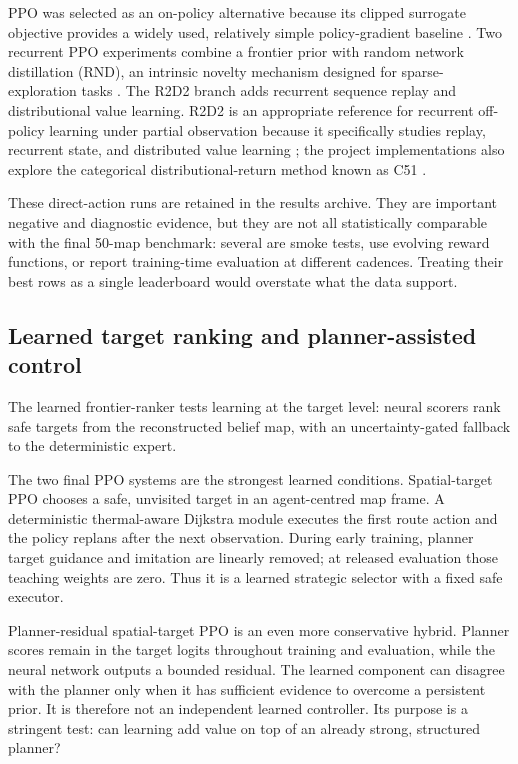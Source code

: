 \documentclass[10pt,letterpaper]{article}
\begin{document}
PPO was selected as an on-policy alternative because its clipped surrogate objective provides a widely used, relatively simple policy-gradient baseline \citep{schulman2017ppo}. Two recurrent PPO experiments combine a frontier prior with random network distillation (RND), an intrinsic novelty mechanism designed for sparse-exploration tasks \citep{burda2019rnd}. The R2D2 branch adds recurrent sequence replay and distributional value learning. R2D2 is an appropriate reference for recurrent off-policy learning under partial observation because it specifically studies replay, recurrent state, and distributed value learning \citep{kapturowski2019r2d2}; the project implementations also explore the categorical distributional-return method known as C51 \citep{bellemare2017distributional}.

These direct-action runs are retained in the results archive. They are important negative and diagnostic evidence, but they are not all statistically comparable with the final 50-map benchmark: several are smoke tests, use evolving reward functions, or report training-time evaluation at different cadences. Treating their best rows as a single leaderboard would overstate what the data support.

\subsection{Learned target ranking and planner-assisted control}

The learned frontier-ranker tests learning at the target level: neural scorers rank safe targets from the reconstructed belief map, with an uncertainty-gated fallback to the deterministic expert.

The two final PPO systems are the strongest learned conditions. Spatial-target PPO chooses a safe, unvisited target in an agent-centred map frame. A deterministic thermal-aware Dijkstra module executes the first route action and the policy replans after the next observation. During early training, planner target guidance and imitation are linearly removed; at released evaluation those teaching weights are zero. Thus it is a learned strategic selector with a fixed safe executor.

Planner-residual spatial-target PPO is an even more conservative hybrid. Planner scores remain in the target logits throughout training and evaluation, while the neural network outputs a bounded residual. The learned component can disagree with the planner only when it has sufficient evidence to overcome a persistent prior. It is therefore not an independent learned controller. Its purpose is a stringent test: can learning add value on top of an already strong, structured planner?
\end{document}
